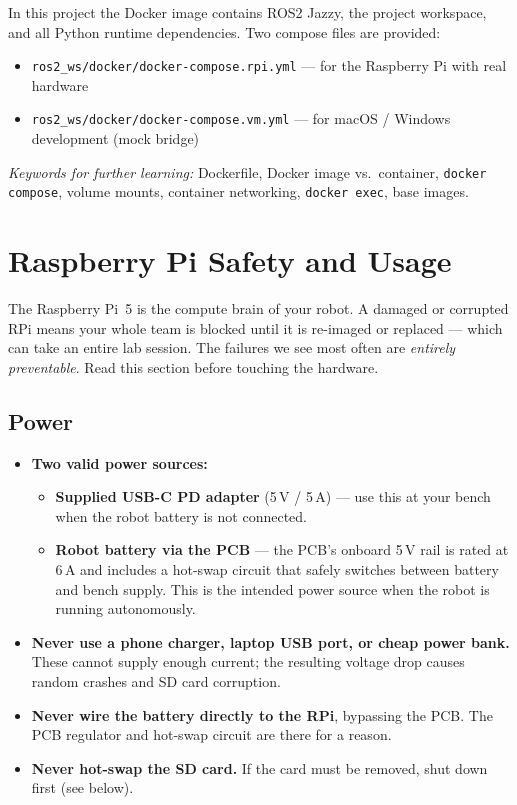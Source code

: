 \documentclass{ol-softwaremanual}
\begin{document}
In this project the Docker image contains ROS2 Jazzy, the project workspace,
and all Python runtime dependencies.
Two compose files are provided:

\begin{itemize}
  \item \texttt{ros2\_ws/docker/docker-compose.rpi.yml} --- for the Raspberry Pi with real hardware
  \item \texttt{ros2\_ws/docker/docker-compose.vm.yml} --- for macOS / Windows development (mock bridge)
\end{itemize}

\noindent\textit{Keywords for further learning:}
Dockerfile, Docker image vs.\ container, \texttt{docker compose}, volume mounts,
container networking, \texttt{docker exec}, base images.


\section{Raspberry Pi Safety and Usage}

The Raspberry Pi~5 is the compute brain of your robot.
A damaged or corrupted RPi means your whole team is blocked until it is
re-imaged or replaced --- which can take an entire lab session.
The failures we see most often are \emph{entirely preventable}.
Read this section before touching the hardware.

\subsection*{Power}

\begin{itemize}
  \item \textbf{Two valid power sources:}
        \begin{itemize}
          \item \textbf{Supplied USB-C PD adapter} (5\,V / 5\,A) --- use this
                at your bench when the robot battery is not connected.
          \item \textbf{Robot battery via the PCB} --- the PCB's onboard 5\,V
                rail is rated at 6\,A and includes a hot-swap circuit that
                safely switches between battery and bench supply.
                This is the intended power source when the robot is running
                autonomously.
        \end{itemize}
  \item \textbf{Never use a phone charger, laptop USB port, or cheap power bank.}
        These cannot supply enough current; the resulting voltage drop causes
        random crashes and SD card corruption.
  \item \textbf{Never wire the battery directly to the RPi}, bypassing the PCB.
        The PCB regulator and hot-swap circuit are there for a reason.
  \item \textbf{Never hot-swap the SD card.}
        If the card must be removed, shut down first (see below).
\end{itemize}
\end{document}
